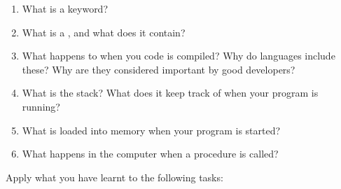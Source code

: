 \begin{enumerate}
  \item What is a keyword?
  \item What is a , and what does it contain?
  \item What happens to  when you code is compiled? Why do languages include these? Why are they considered important by good developers?
  \item What is the stack? What does it keep track of when your program is running?
  \item What is loaded into memory when your program is started?
  \item What happens in the computer when a procedure is called?
\end{enumerate}

\clearpage
Apply what you have learnt to the following tasks:

